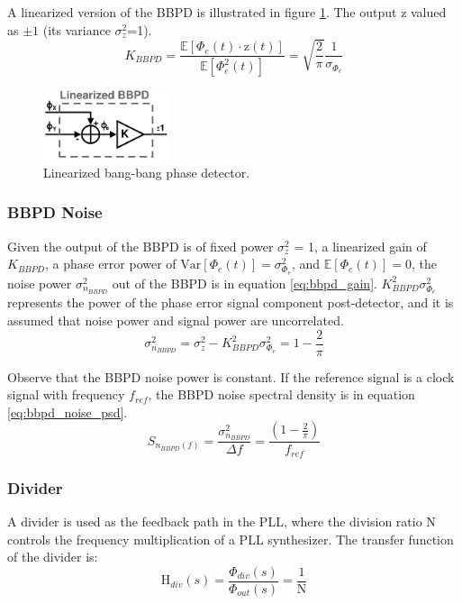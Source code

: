 			A linearized version of the BBPD is illustrated in figure \ref{fig:bbpd_linearized}. The output $\mathrm{z}$ valued as $\pm 1$ (its variance $\sigma_z^2$=1).
			\begin{equation}\label{eq:nom_bbpd_gain}
				K_{BBPD} = \frac{\mathbb{E}[\Phi_e(t)\cdot\mathrm{z}(t)]}{\mathbb{E}[\Phi_e^2(t)]} = \sqrt{\frac{2}{\pi}}\frac{1}{\sigma_{\Phi_e}}
			\end{equation}
			\begin{figure}[htb!]
				\center\includegraphics[width=0.33\textwidth, angle=0]{./figs/theory/bbpd_linearized}
				\caption{Linearized bang-bang phase detector.}
				\label{fig:bbpd_linearized}
			\end{figure}

			\subsubsection*{BBPD Noise}\label{sec:bbpd_noise}
			Given the output of the BBPD is of fixed power $\sigma_z^2$ = 1, a linearized gain of $K_{BBPD}$, a phase error power of $\mathrm{Var}[\Phi_e(t)] = \sigma_{\Phi_e}^2$, and $\mathbb{E}[\Phi_e(t)]=0$, the noise power  $\sigma_{n_{BBPD}}^2$ out of the BBPD is in equation \ref{eq:bbpd_gain}. $K_{BBPD}^2\sigma_{\Phi_e}^2$ represents the power of the phase error signal component post-detector, and it is assumed that noise power and signal power are uncorrelated.
			\begin{equation}\label{eq:bbpd_gain}
				\sigma_{n_{BBPD}}^2 = \sigma_z^2 - K_{BBPD}^2\sigma_{\Phi_e}^2 = 1-\frac{2}{\pi}
			\end{equation}


			Observe that the BBPD noise power is constant. If the reference signal is a clock signal with frequency $f_{ref}$, the BBPD noise spectral density is in equation \ref{eq:bbpd_noise_psd}.
			\begin{equation}\label{eq:bbpd_noise_psd}
				S_{ n_{BBPD}(f)} = \frac{\sigma_{n_{BBPD}}^2}{\Delta f} = \frac{\left(1-\frac{2}{\pi}\right)}{f_{ref}}
			\end{equation}



		\subsubsection{Divider}
			A divider is used as the feedback path in the PLL, where the division ratio N controls the frequency multiplication of a PLL synthesizer. The transfer function of the divider is:
			\begin{equation}
				\mathrm{H}_{div}(s) = \frac{\Phi_{div}(s)}{\Phi_{out}(s)} = \frac{1}{\mathrm{N}}
			\end{equation}


